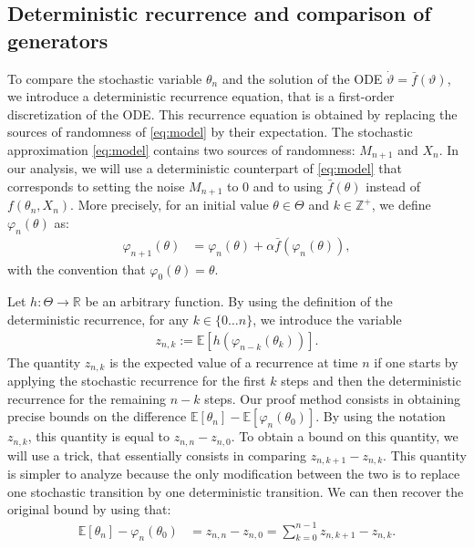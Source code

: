 \documentclass{article}
\newcommand{\R}{\mathbb{R}}
\newcommand{\Z}{\mathbb{Z}}
\newcommand\E{\mathbb{E}}
\newcommand\esp[1]{\E\left[#1\right]}
\begin{document}
\subsection{Deterministic recurrence and comparison of generators}
\label{ssec:generators}

To compare the stochastic variable $\theta_n$ and the solution of the ODE $\dot{\vartheta}=\bar{f}(\vartheta)$, we introduce a deterministic recurrence equation, that is a first-order discretization of the ODE. This recurrence equation is obtained by replacing the sources of randomness of \eqref{eq:model} by their expectation.  The stochastic approximation \eqref{eq:model} contains two sources of randomness: $M_{n+1}$ and $X_n$.  In our analysis, we will use a deterministic counterpart of \eqref{eq:model} that corresponds to setting the noise $M_{n+1}$ to $0$ and to using $\bar{f}(\theta)$ instead of $f(\theta_n,X_n)$. More precisely, for an initial value $\theta\in\Theta$ and $k\in\Z^+$, we define $\varphi_n(\theta)$ as:
\begin{align}
    \label{eq:discrete_rec}
    \varphi_{n+1}(\theta) &= \varphi_n(\theta) + \alpha \bar{f}(\varphi_n(\theta)),
\end{align}
with the convention that $\varphi_0(\theta)=\theta$.

Let $h:\Theta\to\R$ be an arbitrary function. By using the definition of the deterministic recurrence, for any $k\in\{0\dots n\}$, we introduce the variable 
\begin{align}
    \label{eq:z_n_k}
    z_{n,k} := \esp{h(\varphi_{n-k}(\theta_{k}))}.
\end{align}
The quantity $z_{n,k}$ is the expected value of a recurrence at time $n$ if one starts by applying the stochastic recurrence for the first $k$ steps and then the deterministic recurrence for the remaining $n-k$ steps. Our proof method consists in obtaining precise bounds on the difference $\esp{\theta_n}-\esp{\varphi_n(\theta_0)}$. By using the notation $z_{n,k}$, this quantity is equal to $z_{n,n} - z_{n,0}$. To obtain a bound on this quantity, we will use a trick, that essentially consists in comparing $z_{n,k+1} - z_{n,k}$. This quantity is simpler to analyze because the only modification between the two is to replace one stochastic transition by one deterministic transition. We can then recover the original bound by using that:
\begin{align}
    \esp{\theta_n} - \varphi_n(\theta_0) &= z_{n,n} - z_{n,0}
    = \sum_{k=0}^{n-1} z_{n,k+1} - z_{n,k}.\label{eq:z_diff}
\end{align}
\end{document}
